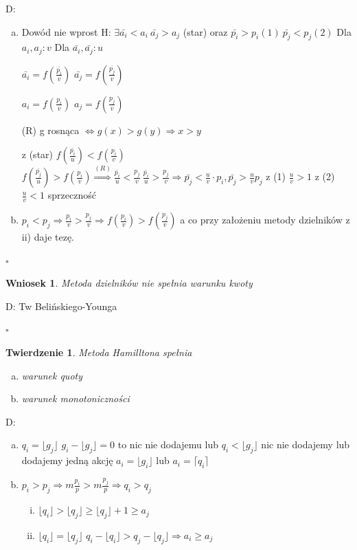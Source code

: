 \documentclass[12pt,a4paper]{article}
\theoremstyle{break}
\newtheorem{theorem}{Twierdzenie}[section]
\newtheorem{wniosek}{Wniosek}[theorem]
\newcommand{\witw}{$\Leftrightarrow$}
\begin{document}
	D: 
	\begin{enumerate}[a)]
		\item Dowód nie wprost
		H: $\exists \bar{a_i} < a_i\: \bar{a_j}>a_j$ (star) oraz $\bar{p_i}>p_i (1) \: \bar{p_j}<p_j (2)$
		Dla $a_i,a_j : v$
		Dla $\bar{a_i},\bar{a_j} : u$
		
		$\bar{a_i}=f(\frac{\bar{p_i}}{v})$	$ \bar{a_j}=f(\frac{\bar{p_j}}{v})$ 	
		
		$a_i=f(\frac{p_i}{v})$ $a_j=f(\frac{p_j}{v})$
		
		(R) g rosnąca \witw $g(x)>g(y) \Rightarrow x>y$
		
		z (star) $f(\frac{\bar{p_i}}{u})<f(\frac{p_i}{v})$
		$f(\frac{\bar{p_j}}{u})>f(\frac{p_i}{v}) \overset{(R)}{\Rightarrow} \frac{\bar{p_i}}{u}<\frac{p_j}{v} \: \frac{\bar{p_i}}{u}>\frac{p_j}{v} \Rightarrow \bar{p_j}<\frac{u}{v}\cdot p_i , \bar{p_j}> \frac{u}{v} p_j$
		z (1) $\frac{u}{v}>1$ 
		z (2) $\frac{u}{v}<1$ sprzeczność
		
		\item $p_i<p_j \Rightarrow \frac{p_i}{v}> \frac{p_j}{v} \Rightarrow f(\frac{p_i}{v})>f(\frac{p_j}{v})$ a co przy założeniu metody dzielników z ii) daje tezę.
	\end{enumerate} 
	\begin{flushright}$\square$\end{flushright}
	
	\begin{wniosek}
		Metoda dzielników nie spełnia warunku kwoty
	\end{wniosek}
	D: Tw Belińskiego-Younga
	\begin{flushright}$\square$\end{flushright}
	
	\begin{theorem}
		Metoda Hamilltona spełnia \begin{enumerate}[a)]
			\item warunek quoty
			\item warunek monotoniczności
		\end{enumerate}
	\end{theorem}
	
	D: \begin{enumerate}[a)]
		\item $q_i=\lfloor g_j\rfloor$ $g_i-\lfloor g_j\rfloor=0$ to nic nie dodajemu lub
		 $q_i<\lfloor g_j\rfloor$ nic nie dodajemy lub dodajemy jedną akcję $a_i=\lfloor g_i\rfloor$ lub $a_i=\lceil q_i\rceil$
		\item $p_i>p_j \Rightarrow m\frac{p_i}{p}>m\frac{p_j}{p} \Rightarrow q_i>q_j$
		\begin{enumerate}[i)]
			\item $\lfloor q_i\rfloor>\lfloor q_j\rfloor\geq \lfloor q_j\rfloor + 1\geq a_j$
			\item $\lfloor q_i\rfloor=\lfloor q_j\rfloor$
			$q_i-\lfloor q_i\rfloor>q_j - \lfloor q_j\rfloor \Rightarrow a_i\geq a_j$
		\end{enumerate}
	\end{enumerate}
	
\end{document}
